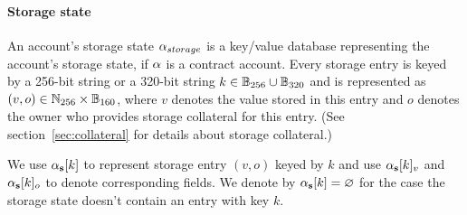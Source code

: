 


\paragraph{Storage state}

An account's storage state $\mathbf{\alpha}_{storage}$ is a key/value database representing the account's storage state, if $\mathbf{\alpha}$ is a contract account. 
%
Every storage entry is keyed by a 256-bit string or a 320-bit string $k\in \mathbb{B}_{256}\cup \mathbb{B}_{320}$ and is represented as $(v,o)\in \mathbb{N}_{256}\times \mathbb{B}_{160}$, where $v$ denotes the value stored in this entry and $o$ denotes the owner who provides storage collateral for this entry. (See section~\ref{sec:collateral} for details about storage collateral.)

We use $\mathbf{\alpha}_{\bf s}[k]$ to represent storage entry $(v,o)$ keyed by $k$ and use $\mathbf{\alpha}_{\bf s}[k]_v$ and $\mathbf{\alpha}_{\bf s}[k]_o$ to denote corresponding fields. We denote by $\mathbf{\alpha}_{\bf s}[k]=\varnothing$ for the case the storage state doesn't contain an entry with key $k$. 





